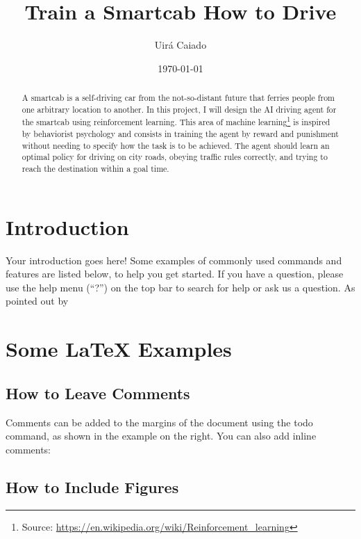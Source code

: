\documentclass[a4paper]{article}
\title{Train a Smartcab How to Drive}
\author{Uirá Caiado}
\date{\today}
\begin{document}
\maketitle

\begin{abstract}
A smartcab is a self-driving car from the not-so-distant future that ferries people from one arbitrary location to another. In this project, I will design the AI driving agent for the smartcab using reinforcement learning. This area of machine learning\footnote{Source: \url{https://en.wikipedia.org/wiki/Reinforcement_learning}} is inspired by behaviorist psychology and consists in training the agent by reward and punishment without needing to specify how the task is to be achieved. The agent should learn an optimal policy for driving on city roads, obeying traffic rules correctly, and trying to reach the destination within a goal time.
\end{abstract}


\section{Introduction}

Your introduction goes here! Some examples of commonly used commands and features are listed below, to help you get started. If you have a question, please use the help menu (``?'') on the top bar to search for help or ask us a question. As pointed out by \cite{Udacity}

\section{Some \LaTeX{} Examples}
\label{sec:examples}

\subsection{How to Leave Comments}

Comments can be added to the margins of the document using the  todo command, as shown in the example on the right. You can also add inline comments:


\subsection{How to Include Figures}
\end{document}
